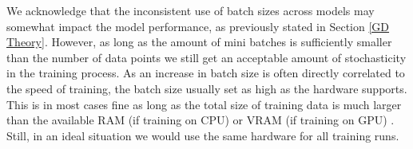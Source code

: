 We acknowledge that the inconsistent use of batch sizes across models may somewhat 
impact the model performance, as previously stated in Section \ref{GD Theory}.
However, as long as the amount of mini batches is sufficiently smaller than the number of data points we 
still get an acceptable amount of stochasticity in the training process. As an increase 
in batch size is often directly correlated to the speed of training, the batch size usually set as high as the hardware supports. This is in most cases fine as long 
as the total size of training data is much larger than the available RAM (if training on CPU) or VRAM (if training on GPU) \citationneeded.
Still, in an ideal situation we would use the same hardware for all training runs.
